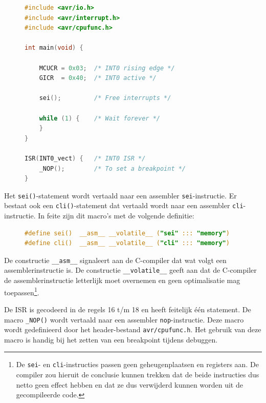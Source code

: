 \begin{figure}[!ht]
\begin{lstlisting}[language=C,caption=Voorbeeld van het gebruik van de INT0 interrupt service routine.,label=cod:intisrforint0]
#include <avr/io.h>
#include <avr/interrupt.h>
#include <avr/cpufunc.h>

int main(void) {
	
	MCUCR = 0x03;  /* INT0 rising edge */
	GICR  = 0x40;  /* INT0 active */
	
	sei();         /* Free interrupts */
	
    while (1) {    /* Wait forever */
    }
}

ISR(INT0_vect) {   /* INT0 ISR */
	_NOP();        /* To set a breakpoint */
}
\end{lstlisting}
\end{figure}

Het \lstinline|sei()|-statement wordt vertaald naar een assembler
\lstinline|sei|-instructie. Er bestaat ook een \lstinline|cli()|-statement
dat vertaald wordt naar een assembler \lstinline|cli|-instructie.
In feite zijn dit macro's met de volgende definitie:

\begin{figure}[!ht]
\begin{lstlisting}[language=C,caption=Definitie van de sei()- en cli()-statements.,label=cod:intseiclidef]
#define sei()  __asm__ __volatile__ ("sei" ::: "memory")
#define cli()  __asm__ __volatile__ ("cli" ::: "memory")
\end{lstlisting}
\end{figure}

De constructie \lstinline|__asm__| signaleert aan de C-compiler dat wat
volgt een assemblerinstructie is. De constructie \lstinline|__volatile__|
geeft aan dat de C-compiler de assemblerinstructie letterlijk moet
overnemen en geen optimalisatie mag toepassen\footnote{De
\lstinline|sei|- en \lstinline|cli|-instructies passen geen
geheugenplaatsen en registers aan. De compiler zou hieruit de conclusie
kunnen trekken dat de beide instructies dus netto geen effect hebben en
dat ze dus verwijderd kunnen worden uit de gecompileerde code.}.

De ISR is gecodeerd in de regels 16 t/m 18 en heeft feitelijk \'e\'en
statement. De macro \lstinline|_NOP()| wordt vertaald naar een assembler
\lstinline|nop|-instructie. Deze macro wordt gedefinieerd door het
header-bestand \lstinline|avr/cpufunc.h|. Het gebruik van deze macro
is handig bij het zetten van een breakpoint tijdens debuggen.

